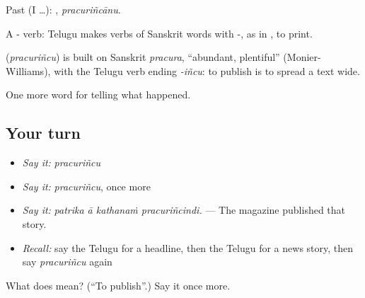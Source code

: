 Past (I …): , \emph{pracuriñcānu}.

A - verb: Telugu makes verbs of Sanskrit words with -, as in , to print.

\begin{cousinweb}
\textbf{} (\emph{pracuriñcu}) is built on Sanskrit \emph{pracura}, \textquotedblleft{}abundant, plentiful\textquotedblright{} (Monier-Williams), with the Telugu verb ending \emph{-iñcu}: to publish is to spread a text wide.
\end{cousinweb}

\begin{grammarlens}[title={What you've built}]
One more word for telling what happened.
\end{grammarlens}

\subsection*{Your turn}
\begin{itemize}
\raggedright
  \item \emph{Say it:} \emph{pracuriñcu}
  \item \emph{Say it:} \emph{pracuriñcu}, once more
  \item \emph{Say it:} \emph{patrika ā kathanaṁ pracuriñcindi.} — The magazine published that story.
  \item \emph{Recall:} say the Telugu for a headline, then the Telugu for a news story, then say \emph{pracuriñcu} again
\end{itemize}

\begin{tcolorbox}[breakable,colback=teal!4,colframe=teal!35!black,title={Before you move on}]
What does  mean? (\textquotedblleft{}To publish\textquotedblright{}.) Say it once more.
\end{tcolorbox}
